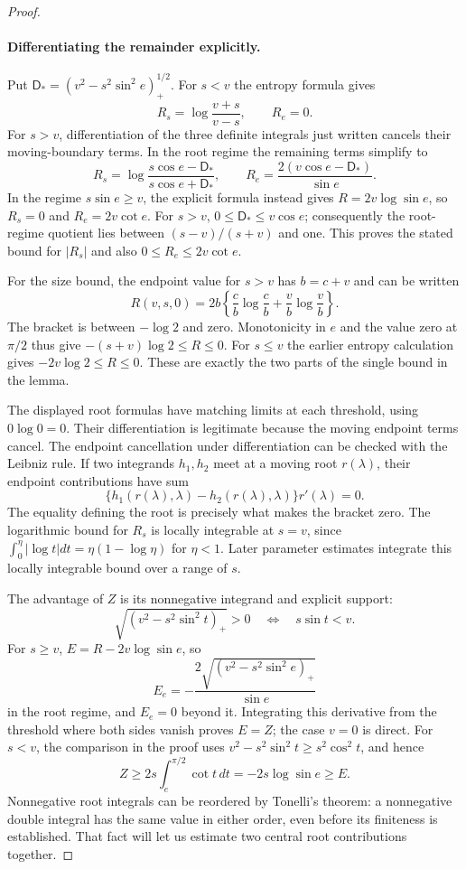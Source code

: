 \begin{proof}
\paragraph{Differentiating the remainder explicitly.}
Put $\mathsf{D}_*=(v^2-s^2\sin^2e)_+^{1/2}$. For $s<v$ the entropy
formula gives
\[
 R_s=\log\frac{v+s}{v-s},\qquad R_e=0.
\]
For $s>v$, differentiation of the three definite integrals just written
cancels their moving-boundary terms. In the root regime the remaining
terms simplify to
\[
 R_s=\log\frac{s\cos e-\mathsf{D}_*}{s\cos e+\mathsf{D}_*},\qquad
 R_e=\frac{2(v\cos e-\mathsf{D}_*)}{\sin e}.
\]
In the regime $s\sin e\geq v$, the explicit formula instead gives
$R=2v\log\sin e$, so $R_s=0$ and $R_e=2v\cot e$. For $s>v$,
$0\leq \mathsf{D}_*\leq v\cos e$; consequently the root-regime quotient
lies between $(s-v)/(s+v)$ and one. This proves the stated bound for
$|R_s|$ and also $0\leq R_e\leq2v\cot e$.

For the size bound, the endpoint value for $s>v$ has $b=c+v$ and
can be written
\[
 R(v,s,0)=2b\left\{\frac cb\log\frac cb+
                         \frac vb\log\frac vb\right\}.
\]
The bracket is between $-\log2$ and zero. Monotonicity in $e$ and
the value zero at $\pi/2$ thus give $-(s+v)\log2\leq R\leq0$.
For $s\leq v$ the earlier entropy calculation gives
$-2v\log2\leq R\leq0$. These are exactly the two parts of the
single bound in the lemma.

The displayed root formulas have matching limits at each threshold,
using $0\log0=0$. Their differentiation is legitimate because the
moving endpoint terms cancel.
The endpoint cancellation under differentiation can be checked with
the Leibniz rule. If two integrands $h_1,h_2$ meet at a moving root
$r(\lambda)$, their endpoint contributions have sum
\[
 \{h_1(r(\lambda),\lambda)-h_2(r(\lambda),\lambda)\}r'(\lambda)=0.
\]
The equality defining the root is precisely what makes the bracket zero.
The logarithmic bound for $R_s$ is locally integrable at $s=v$, since
$\int_0^\eta|\log t|dt=\eta(1-\log\eta)$ for $\eta<1$.
Later parameter estimates integrate this locally integrable bound over
a range of $s$.

The advantage of $Z$ is its nonnegative integrand and explicit
support:
\[
 \sqrt{(v^2-s^2\sin^2t)_+}>0\quad\Longleftrightarrow\quad s\sin t<v.
\]
For $s\geq v$, $E=R-2v\log\sin e$, so
\[
 E_e=-\frac{2\sqrt{(v^2-s^2\sin^2e)_+}}{\sin e}
\]
in the root regime, and $E_e=0$ beyond it. Integrating this derivative
from the threshold where both sides vanish proves $E=Z$; the case
$v=0$ is direct. For $s<v$, the comparison in the
proof uses $v^2-s^2\sin^2t\geq s^2\cos^2t$, and hence
\[
 Z\geq2s\int_e^{\pi/2}\cot t\,dt=-2s\log\sin e\geq E.
\]
Nonnegative root integrals can be reordered by Tonelli's theorem: a
nonnegative double integral has the same value in either order, even
before its finiteness is established. That fact will let us estimate two
central root contributions together.
\end{proof}


